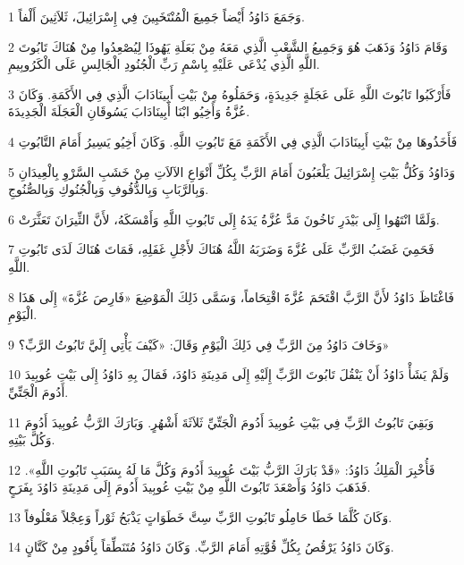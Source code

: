 \par 1 وَجَمَعَ دَاوُدُ أَيْضاً جَمِيعَ الْمُنْتَخَبِينَ فِي إِسْرَائِيلَ، ثَلاَثِينَ أَلْفاً.
\par 2 وَقَامَ دَاوُدُ وَذَهَبَ هُوَ وَجَمِيعُ الشَّعْبِ الَّذِي مَعَهُ مِنْ بَعَلَةِ يَهُوذَا لِيُصْعِدُوا مِنْ هُنَاكَ تَابُوتَ اللَّهِ الَّذِي يُدْعَى عَلَيْهِ بِاسْمِ رَبِّ الْجُنُودِ الْجَالِسِ عَلَى الْكَرُوبِيمِ.
\par 3 فَأَرْكَبُوا تَابُوتَ اللَّهِ عَلَى عَجَلَةٍ جَدِيدَةٍ، وَحَمَلُوهُ مِنْ بَيْتِ أَبِينَادَابَ الَّذِي فِي الأَكَمَةِ. وَكَانَ عُزَّةُ وَأَخِيُو ابْنَا أَبِينَادَابَ يَسُوقَانِ الْعَجَلَةَ الْجَدِيدَةَ.
\par 4 فَأَخَذُوهَا مِنْ بَيْتِ أَبِينَادَابَ الَّذِي فِي الأَكَمَةِ مَعَ تَابُوتِ اللَّهِ. وَكَانَ أَخِيُو يَسِيرُ أَمَامَ التَّابُوتِ
\par 5 وَدَاوُدُ وَكُلُّ بَيْتِ إِسْرَائِيلَ يَلْعَبُونَ أَمَامَ الرَّبِّ بِكُلِّ أَنْوَاعِ الآلاَتِ مِنْ خَشَبِ السَّرْوِ بِالْعِيدَانِ وَبِالرَّبَابِ وَبِالدُّفُوفِ وَبِالْجُنُوكِ وَبِالصُّنُوجِ.
\par 6 وَلَمَّا انْتَهُوا إِلَى بَيْدَرِ نَاخُونَ مَدَّ عُزَّةُ يَدَهُ إِلَى تَابُوتِ اللَّهِ وَأَمْسَكَهُ، لأَنَّ الثِّيرَانَ تَعَثَّرَتْ.
\par 7 فَحَمِيَ غَضَبُ الرَّبِّ عَلَى عُزَّةَ وَضَرَبَهُ اللَّهُ هُنَاكَ لأَجْلِ غَفَلِهِ، فَمَاتَ هُنَاكَ لَدَى تَابُوتِ اللَّهِ.
\par 8 فَاغْتَاظَ دَاوُدُ لأَنَّ الرَّبَّ اقْتَحَمَ عُزَّةَ اقْتِحَاماً، وَسَمَّى ذَلِكَ الْمَوْضِعَ «فَارِصَ عُزَّةَ» إِلَى هَذَا الْيَوْمِ.
\par 9 وَخَافَ دَاوُدُ مِنَ الرَّبِّ فِي ذَلِكَ الْيَوْمِ وَقَالَ: «كَيْفَ يَأْتِي إِلَيَّ تَابُوتُ الرَّبِّ؟»
\par 10 وَلَمْ يَشَأْ دَاوُدُ أَنْ يَنْقُلَ تَابُوتَ الرَّبِّ إِلَيْهِ إِلَى مَدِينَةِ دَاوُدَ، فَمَالَ بِهِ دَاوُدُ إِلَى بَيْتِ عُوبِيدَ أَدُومَ الْجَتِّيِّ.
\par 11 وَبَقِيَ تَابُوتُ الرَّبِّ فِي بَيْتِ عُوبِيدَ أَدُومَ الْجَتِّيِّ ثَلاَثَةَ أَشْهُرٍ. وَبَارَكَ الرَّبُّ عُوبِيدَ أَدُومَ وَكُلَّ بَيْتِهِ.
\par 12 فَأُخْبِرَ الْمَلِكُ دَاوُدُ: «قَدْ بَارَكَ الرَّبُّ بَيْتَ عُوبِيدَ أَدُومَ وَكُلَّ مَا لَهُ بِسَبَبِ تَابُوتِ اللَّهِ». فَذَهَبَ دَاوُدُ وَأَصْعَدَ تَابُوتَ اللَّهِ مِنْ بَيْتِ عُوبِيدَ أَدُومَ إِلَى مَدِينَةِ دَاوُدَ بِفَرَحٍ.
\par 13 وَكَانَ كُلَّمَا خَطَا حَامِلُو تَابُوتِ الرَّبِّ سِتَّ خَطَوَاتٍ يَذْبَحُ ثَوْراً وَعِجْلاً مَعْلُوفاً.
\par 14 وَكَانَ دَاوُدُ يَرْقُصُ بِكُلِّ قُوَّتِهِ أَمَامَ الرَّبِّ. وَكَانَ دَاوُدُ مُتَنَطِّقاً بِأَفُودٍ مِنْ كَتَّانٍ.
